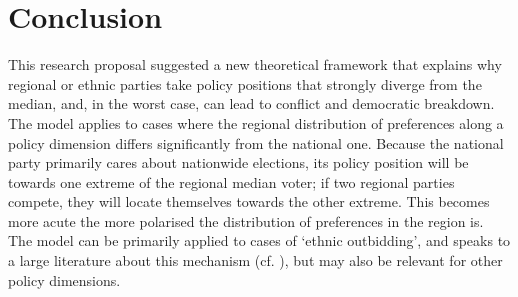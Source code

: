 \documentclass[11pt]{article}
\begin{document}
\section{Conclusion}

This research proposal suggested a new theoretical framework that explains why regional or ethnic parties take policy positions that strongly diverge from the median, and, in the worst case, can lead to conflict and democratic breakdown. The model applies to cases where the regional distribution of preferences along a policy dimension differs significantly from the national one. Because the national party primarily cares about nationwide elections, its policy position will be towards one extreme of the regional median voter; if two regional parties compete, they will locate themselves towards the other extreme. This becomes more acute the more polarised the distribution of preferences in the region is. The model can be primarily applied to cases of `ethnic outbidding', and speaks to a large literature about this mechanism (cf. \textcite{Horowitz2000}), but may also be relevant for other policy dimensions.

\renewcommand*{\mkbibnamefamily}[1]{\textsc{\textbf{#1}}}
\renewcommand*{\mkbibnamegiven}[1]{\textsc{#1}}
\printbibliography
\end{document}
